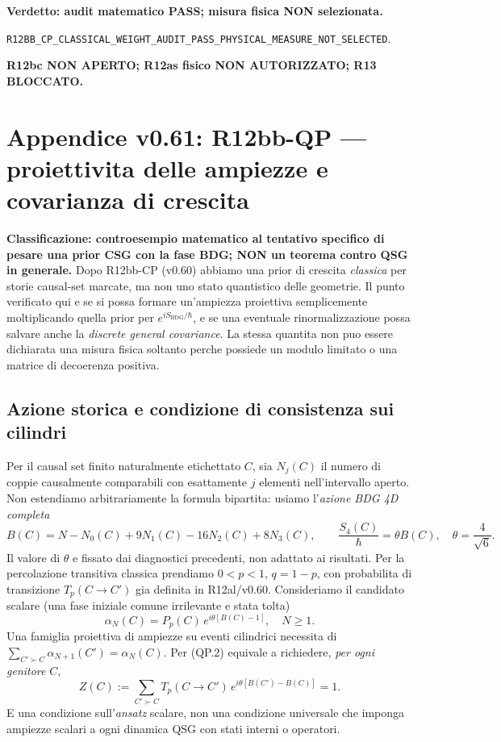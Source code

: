 \documentclass[11pt,a4paper]{article}
\begin{document}
\textbf{Verdetto: audit matematico PASS; misura fisica NON selezionata.}

{\small\nolinkurl{R12BB_CP_CLASSICAL_WEIGHT_AUDIT_PASS_PHYSICAL_MEASURE_NOT_SELECTED}.}

\textbf{R12bc NON APERTO; R12as fisico NON AUTORIZZATO; R13 BLOCCATO.}




\section*{Appendice v0.61: R12bb-QP --- proiettivita delle ampiezze e covarianza di crescita}
\label{sec:r12bbqp}
\textbf{Classificazione: controesempio matematico al tentativo specifico di pesare una prior CSG con la fase BDG; NON un teorema contro QSG in generale.}
Dopo R12bb-CP (v0.60) abbiamo una prior di crescita \emph{classica} per storie causal-set marcate, ma non uno stato quantistico delle geometrie. Il punto verificato qui e se si possa formare un'ampiezza proiettiva semplicemente moltiplicando quella prior per $e^{iS_{\mathrm{BDG}}/\hbar}$, e se una eventuale rinormalizzazione possa salvare anche la \emph{discrete general covariance}. La stessa quantita non puo essere dichiarata una misura fisica soltanto perche possiede un modulo limitato o una matrice di decoerenza positiva.

\subsection*{Azione storica e condizione di consistenza sui cilindri}
Per il causal set finito naturalmente etichettato $C$, sia $N_j(C)$ il numero di coppie causalmente comparabili con esattamente $j$ elementi nell'intervallo aperto. Non estendiamo arbitrariamente la formula bipartita: usiamo l'\emph{azione BDG 4D completa}
\begin{equation}
 B(C)=N-N_0(C)+9N_1(C)-16N_2(C)+8N_3(C),\qquad
 \frac{S_4(C)}{\hbar}=\theta B(C),\quad \theta=\frac4{\sqrt6}.\tag{QP.1}
\end{equation}
Il valore di $\theta$ e fissato dai diagnostici precedenti, non adattato ai risultati. Per la percolazione transitiva classica prendiamo $0<p<1$, $q=1-p$, con probabilita di transizione $T_p(C\!\to\!C')$ gia definita in R12al/v0.60. Consideriamo il candidato scalare (una fase iniziale comune irrilevante e stata tolta)
\begin{equation}
 \alpha_N(C)=P_p(C)\,e^{i\theta[B(C)-1]}, \quad N\ge1.\tag{QP.2}
\end{equation}
Una famiglia proiettiva di ampiezze su eventi cilindrici necessita di $\sum_{C'\succ C}\alpha_{N+1}(C')=\alpha_N(C)$. Per (QP.2) equivale a richiedere, \emph{per ogni genitore} $C$,
\begin{equation}
 Z(C):=\sum_{C'\succ C}T_p(C\to C')\,e^{i\theta[B(C')-B(C)]}=1.\tag{QP.3}
\end{equation}
E una condizione sull'\emph{ansatz} scalare, non una condizione universale che imponga ampiezze scalari a ogni dinamica QSG con stati interni o operatori.
\end{document}
